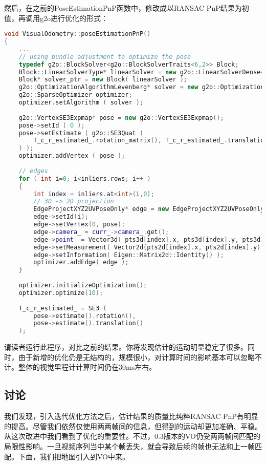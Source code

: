 然后，在之前的PoseEstimationPnP函数中，修改成以RANSAC PnP结果为初值，再调用g2o进行优化的形式：
\begin{lstlisting}[language=c++,caption=slambook/project/0.3/src/visual\_odometry.cpp]
void VisualOdometry::poseEstimationPnP()
{
	... 
	// using bundle adjustment to optimize the pose 
	typedef g2o::BlockSolver<g2o::BlockSolverTraits<6,2>> Block;
	Block::LinearSolverType* linearSolver = new g2o::LinearSolverDense<Block::PoseMatrixType>();
	Block* solver_ptr = new Block( linearSolver );
	g2o::OptimizationAlgorithmLevenberg* solver = new g2o::OptimizationAlgorithmLevenberg ( solver_ptr );
	g2o::SparseOptimizer optimizer;
	optimizer.setAlgorithm ( solver );
	
	g2o::VertexSE3Expmap* pose = new g2o::VertexSE3Expmap();
	pose->setId ( 0 );
	pose->setEstimate ( g2o::SE3Quat (
		T_c_r_estimated_.rotation_matrix(), T_c_r_estimated_.translation()
	) );
	optimizer.addVertex ( pose );
	
	// edges
	for ( int i=0; i<inliers.rows; i++ )
	{
		int index = inliers.at<int>(i,0);
		// 3D -> 2D projection
		EdgeProjectXYZ2UVPoseOnly* edge = new EdgeProjectXYZ2UVPoseOnly();
		edge->setId(i);
		edge->setVertex(0, pose);
		edge->camera_ = curr_->camera_.get();
		edge->point_ = Vector3d( pts3d[index].x, pts3d[index].y, pts3d[index].z );
		edge->setMeasurement( Vector2d(pts2d[index].x, pts2d[index].y) );
		edge->setInformation( Eigen::Matrix2d::Identity() );
		optimizer.addEdge( edge );
	}
	
	optimizer.initializeOptimization();
	optimizer.optimize(10);
	
	T_c_r_estimated_ = SE3 (
		pose->estimate().rotation(),
		pose->estimate().translation()
	);
\end{lstlisting}

请读者运行此程序，对比之前的结果。你将发现估计的运动明显稳定了很多。同时，由于新增的优化仍是无结构的，规模很小，对计算时间的影响基本可以忽略不计。整体的视觉里程计计算时间仍在30ms左右。

\subsection*{讨论}
我们发现，引入迭代优化方法之后，估计结果的质量比纯粹RANSAC PnP有明显的提高。尽管我们依然仅使用两两帧间的信息，但得到的运动却更加准确、平稳。从这次改进中我们看到了优化的重要性。不过，0.3版本的VO仍受两两帧间匹配的局限性影响。一旦视频序列当中某个帧丢失，就会导致后续的帧也无法和上一帧匹配。下面，我们把地图引入到VO中来。

